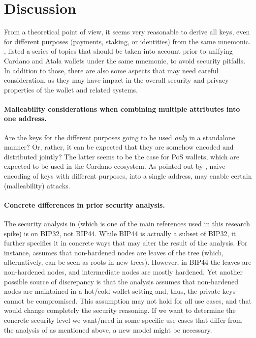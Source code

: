 \section{Discussion}
\label{sec:discussion}

From a theoretical point of view, it seems very reasonable to derive all
keys, even for different purposes (payments, staking, or identities) from
the same mnemonic. , listed a series of topics
that should be taken into account prior to unifying Cardano and Atala
wallets under the same mnemonic, to avoid security pitfalls. In addition to
those,  there are also some aspects that may need careful consideration, as they
may have impact in the overall security and privacy properties of the wallet
and related systems.

\paragraph{Malleability considerations when combining multiple
  attributes into one address.} %
Are the keys for the different purposes going to be used \emph{only} in a
standalone manner? Or, rather, it can be expected that they are somehow
encoded and distributed jointly? The latter seems to be the case for PoS
wallets, which are expected to be used in the Cardano ecosystem. As pointed
out by \cite{kkl20}, naive encoding of keys with different purposes, into
a single address, may enable certain (malleability) attacks.

\paragraph{Concrete differences in prior security analysis.} %
The security analysis in \cite{def+21} (which is one of the main references
used in this research spike) is on BIP32, not BIP44. While BIP44
is actually a subset of BIP32, it further specifies it in concrete ways
that may alter the result of the analysis. For instance, \cite{def+21}
assumes that non-hardened nodes are leaves of the tree (which, alternatively,
can be seen as roots in new trees). However, in BIP44 the leaves are
non-hardened nodes, and intermediate nodes are mostly hardened. Yet another
possible source of discrepancy is that the analysis assumes that non-hardened
nodes are maintained in a hot/cold wallet setting and, thus, the private keys
cannot be compromised. This assumption may not hold for all use cases, and
that would change completely the security reasoning. If we want to determine
the concrete security level we want/need in some specific use cases that differ
from the analysis of \cite{def+21} as mentioned above, a new model might be
necessary.


